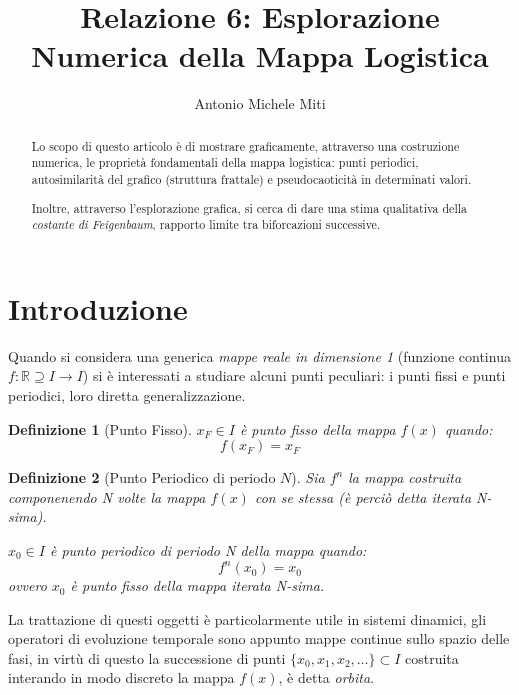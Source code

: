 \documentclass[13pt]{article}
\title{Relazione 6: Esplorazione Numerica della Mappa Logistica}
\author{Antonio Michele Miti}
\newtheorem{legge}{Definizione}
\begin{document}
\maketitle
\begin{abstract}
Lo scopo di questo articolo è di mostrare graficamente, attraverso una costruzione numerica, le proprietà fondamentali della mappa logistica: punti periodici, autosimilarità del grafico (struttura frattale) e pseudocaoticità in determinati valori.

Inoltre, attraverso l'esplorazione grafica, si cerca di dare una stima qualitativa della \emph{costante di Feigenbaum}, rapporto limite tra biforcazioni successive.

	
\end{abstract}


\section{Introduzione}

Quando si considera una generica \emph{mappe reale in dimensione 1} (funzione continua $ f: \mathbb{R} \supseteq I \rightarrow I$) si è interessati a studiare alcuni punti peculiari: i punti fissi e punti periodici, loro diretta generalizzazione.

	\begin{legge}[Punto Fisso]
	$x_{F} \in I$ è punto fisso della mappa $f(x)$ quando:	
		\begin{equation}
		f(x_{F}) = x_{F}
		\end{equation}
	\end{legge}

	\begin{legge}[Punto Periodico di periodo $N$]
	Sia $f^{n}$ la mappa costruita componenendo N volte la mappa $f(x)$ con se stessa (è perciò detta iterata N-sima). 

$x_{0} \in I$ è punto periodico di periodo N della mappa quando:	
		\begin{equation}
		f^{n}(x_{0}) = x_{0}
		\end{equation}
ovvero $x_{0}$ è punto fisso della mappa iterata N-sima. 
	\end{legge}

La trattazione di questi oggetti è particolarmente utile in sistemi dinamici, gli operatori di evoluzione temporale sono appunto mappe continue sullo spazio delle fasi, in virtù di questo la successione di punti $\{x_{0}, x_{1}, x_{2}, \ldots\} \subset I $ costruita interando in modo discreto la mappa $f(x)$, è detta \emph{orbita}.
\end{document}

